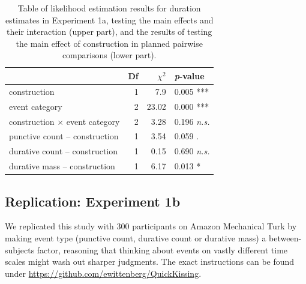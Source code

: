 \documentclass[review,12pt,authoryear]{elsarticle}
\newcommand*{\sectionformat}{\centering}
\begin{document}
\begin{table}[ht]
\centering
\begin{tabular}{lrrl}
  \hline
 & Df &  $\chi^2$ & \emph{p}-value \\ 
  \hline
construction          & 1 &  7.9 & 0.005 *** \\ 
  event category          & 2 &  23.02 & 0.000 ***\\ 
  construction $\times$ event category & 2 & 3.28 & 0.196 \emph{n.s.} \\    \hline
   punctive count -- construction    & 1 & 3.54 & 0.059 . \\    
   durative count -- construction    & 1  & 0.15 & 0.690 \emph{n.s.}\\ 
   durative mass -- construction   & 1 &  6.17 & 0.013 *\\ \hline
\end{tabular}
\caption{Table of likelihood estimation results for duration estimates in Experiment 1a, testing the main effects and their interaction (upper part), and the results of testing the main effect of construction in planned pairwise comparisons (lower part).}
\label{table_OEregr}
\end{table}




\subsection*{\sectionformat Replication: Experiment 1b}\label{repl_OE}

We replicated this study with 300 participants on Amazon Mechanical Turk by making event type (punctive count, durative count or durative mass) a between-subjects factor, reasoning that thinking about events on vastly different time scales might wash out sharper judgments. \citep{grondin1999start,zakay1995attentional} The exact instructions can be found under \url{https://github.com/ewittenberg/QuickKissing}.
\end{document}
